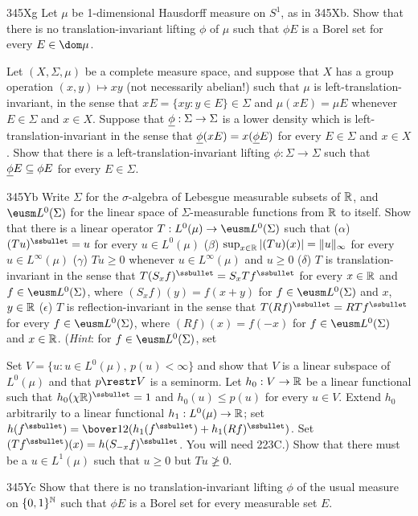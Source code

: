 {\spheader 345Xg Let $\mu$ be 1-dimensional Hausdorff measure on $S^1$, as in 345Xb.   Show that there is no translation-invariant lifting $\phi$ of $\mu$ such that $\phi E$ is a Borel set for every $E\in\dom\mu$.

  Let $(X,\Sigma,\mu)$ be a
complete measure space, and suppose that $X$ has a group operation
$(x,y)\mapsto xy$ (not necessarily abelian!) such that $\mu$ is
left-translation-invariant, in the sense that
$xE=\{xy:y\in E\}\in\Sigma$ and $\mu(xE)=\mu E$ whenever $E\in\Sigma$
and $x\in X$.   Suppose that ${\underline{\phi}}:\Sigma\to\Sigma$ is a lower
density which is
left-translation-invariant in the sense that ${\underline{\phi}}(xE)=x({\underline{\phi}} E)$
for every $E\in\Sigma$ and $x\in X$.   Show that there is a
left-translation-invariant lifting $\phi:\Sigma\to\Sigma$ such that
${\underline{\phi}} E\subseteq\phi E$ for every $E\in\Sigma$.

\spheader 345Yb Write $\Sigma$ for the $\sigma$-algebra of Lebesgue
measurable subsets of $\Bbb R$, and $\eusm L^0(\Sigma)$ for the linear
space of $\Sigma$-measurable functions from $\Bbb R$ to itself.   Show
that there is a linear operator
$T:L^0(\mu)\to\eusm L^0(\Sigma)$ such that ($\alpha$)
$(Tu)^{\ssbullet}=u$ for every $u\in L^0(\mu)$ ($\beta$)
$\sup_{x\in\Bbb R}|(Tu)(x)|=\|u\|_{\infty}$ for every
$u\in L^{\infty}(\mu)$ ($\gamma$) $Tu\ge 0$ whenever
$u\in L^{\infty}(\mu)$ and $u\ge 0$ ($\delta$) $T$ is
translation-invariant in the sense that
$T(S_xf)^{\ssbullet}=S_xTf^{\ssbullet}$ for every $x\in\Bbb R$ and
$f\in\eusm L^0(\Sigma)$, where $(S_xf)(y)=f(x+y)$ for
$f\in\eusm L^0(\Sigma)$ and $x$, $y\in\Bbb R$ ($\epsilon$) $T$ is
reflection-invariant in the sense that
$T(Rf)^{\ssbullet}=RTf^{\ssbullet}$ for every $f\in\eusm L^0(\Sigma)$,
where $(Rf)(x)=f(-x)$ for $f\in\eusm L^0(\Sigma)$ and $x\in\Bbb R$.
({\it Hint\/}:  for $f\in\eusm L^0(\Sigma)$, set


\noindent Set $V=\{u:u\in L^0(\mu),\,p(u)<\infty\}$ and show that $V$ is
a linear subspace of $L^0(\mu)$ and that $p\restr V$ is a seminorm.
Let $h_0:V\to\Bbb R$ be a linear functional such that
$h_0(\chi\Bbb R)^{\ssbullet}=1$ and $h_0(u)\le p(u)$ for every $u\in V$.
Extend $h_0$ arbitrarily to a linear functional $h_1:L^0(\mu)\to\Bbb R$;
set $h(f^{\ssbullet})=\bover12(h_1(f^{\ssbullet})+h_1(Rf)^{\ssbullet})$.
Set $(Tf^{\ssbullet})(x)=h(S_{-x}f)^{\ssbullet}$.   You will need 223C.)
Show that
there must be a $u\in L^1(\mu)$ such that $u\ge 0$ but $Tu\not\ge 0$.

\spheader 345Yc Show that there is no translation-invariant lifting
$\phi$ of the usual measure on $\{0,1\}^{\Bbb N}$ such that $\phi E$ is a
Borel set for every measurable set $E$.
}%

